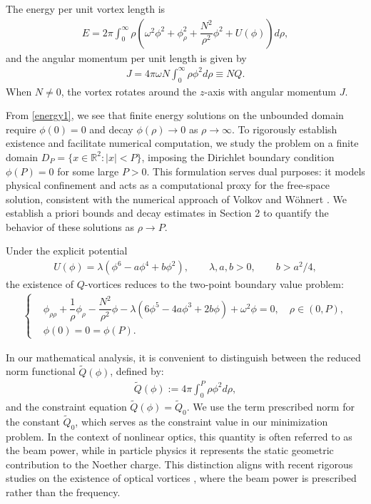 \documentclass[12pt]{article}
\begin{document}
The energy per unit vortex length is
\begin{align}
    E=2\pi\int_0^{\infty}\rho\left(\omega^2\phi^2+\phi_{\rho}^2+\dfrac{N^2}{\rho^2}\phi^2+U(\phi)\right)d\rho,\label{energy1}
\end{align}
and the angular momentum per unit length is given by
\begin{align}
    J=4\pi\omega N\int_0^{\infty}\rho\phi^2d\rho\equiv NQ.
\end{align}
When $N\neq 0$, the vortex rotates around the $z$-axis with angular momentum $J$.

From \eqref{energy1}, we see that finite energy solutions on the unbounded domain require $\phi(0)=0$ and decay $\phi(\rho)\rightarrow 0$ as $\rho\rightarrow\infty$. To rigorously establish existence and facilitate numerical computation, we study the problem on a finite domain $D_P = \{ x \in \mathbb{R}^2 : |x| < P \}$, imposing the Dirichlet boundary condition $\phi(P)=0$ for some large $P>0$. This formulation serves dual purposes: it models physical confinement and acts as a computational proxy for the free-space solution, consistent with the numerical approach of Volkov and W\"ohnert \cite{VW}. We establish a priori bounds and decay estimates in Section 2 to quantify the behavior of these solutions as $\rho \to P$.

Under the explicit potential
\begin{align}
    U(\phi)=\lambda\left(\phi^6-a\phi^4+b\phi^2\right), \qquad \lambda,a,b>0,\qquad b>a^2/4,
\end{align}
the existence of $Q$-vortices reduces to the two-point boundary value problem:
\begin{align}
    \left\{\begin{array}{cc}
        &\phi_{\rho\rho}+\dfrac{1}{\rho}\phi_{\rho}-\dfrac{N^2}{\rho^2}\phi-\lambda(6\phi^5-4a\phi^3+2b\phi)+\omega^2\phi=0, \quad\rho\in(0,P),\label{DE}\\
        &\phi(0)=0=\phi(P).
    \end{array}\right.
\end{align}

In our mathematical analysis, it is convenient to distinguish between the reduced norm functional $\tilde{Q}(\phi)$, defined by:
\begin{align}
    \tilde{Q}(\phi):=4\pi\int_0^P\rho\phi^2d\rho,\label{ConstraintFunctional1}
\end{align}
and the constraint equation $\tilde{Q}(\phi)=\tilde{Q}_0$. We use the term prescribed norm for the constant $\tilde{Q}_0$, which serves as the constraint value in our minimization problem. In the context of nonlinear optics, this quantity is often referred to as the beam power, while in particle physics it represents the static geometric contribution to the Noether charge. This distinction aligns with recent rigorous studies on the existence of optical vortices \cite{ChenSu2022, Guo2019, Greco2016, Medina2017, Medina2021, Medina2023}, where the beam power is prescribed rather than the frequency.
\end{document}
